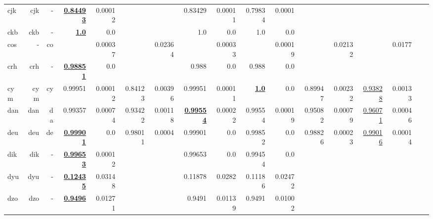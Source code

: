 \documentclass[11pt]{article}
\begin{document}
\begin{table*}[h]
{\begin{tabular}{lrrrrrrrrrrrrrrrr}
cjk         & cjk         & -         & \textbf{\underline{0.84493}}         & 0.00012         &          &          & 0.83429         & 0.00011         & 0.79834         & 0.0001         &          &          &          &          \\
ckb         & ckb         & -         & \textbf{\underline{1.0}}         & 0.0         &          &          & 1.0         & 0.0         & 1.0         & 0.0         &          &          &          &          \\
cos         & -         & co         &          & 0.00037         &          & 0.02364         &          & 0.00033         &          & 0.00019         &          & 0.02132         &          & 0.0177         \\
crh         & crh         & -         & \textbf{\underline{0.98851}}         & 0.0         &          &          & 0.988         & 0.0         & 0.988         & 0.0         &          &          &          &          \\
cym         & cym         & cy         & 0.99951         & 0.00012         & 0.84123         & 0.00396         & 0.99951         & 0.00011         & \textbf{\underline{1.0}}         & 0.0         & 0.89947         & 0.00232         & \underline{0.93828}         & 0.00133         \\
dan         & dan         & da         & 0.99357         & 0.00074         & 0.93422         & 0.00118         & \textbf{\underline{0.99554}}         & 0.00022         & 0.99554         & 0.00019         & 0.95082         & 0.00079         & \underline{0.96071}         & 0.00046         \\
deu         & deu         & de         & \textbf{\underline{0.99901}}         & 0.0         & 0.98011         & 0.0004         & 0.99901         & 0.0         & 0.99852         & 0.0         & 0.98826         & 0.00023         & \underline{0.99016}         & 0.00014         \\
dik         & dik         & -         & \textbf{\underline{0.99653}}         & 0.00012         &          &          & 0.99653         & 0.0         & 0.99454         & 0.0         &          &          &          &          \\
dyu         & dyu         & -         & \textbf{\underline{0.12435}}         & 0.03148         &          &          & 0.11878         & 0.0282         & 0.11186         & 0.02472         &          &          &          &          \\
dzo         & dzo         & -         & \textbf{\underline{0.9496}}         & 0.01271         &          &          & 0.9491         & 0.01139         & 0.9491         & 0.01002         &          &          &          &          \\

\end{tabular}}
\end{table*}
\end{document}
